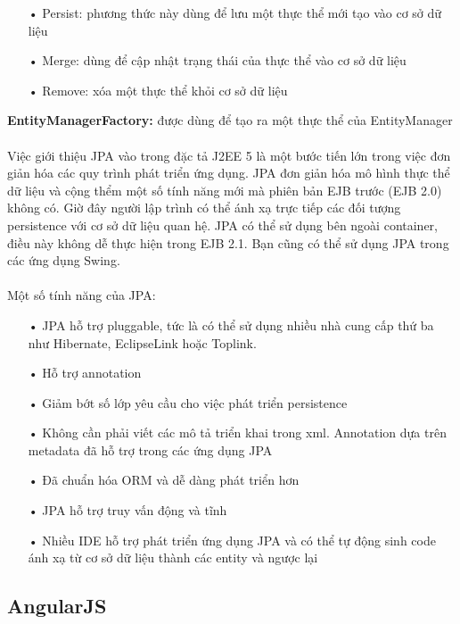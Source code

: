 \documentclass[a4paper]{article}
\begin{document}
\begin{itemize}
	\item[•]Persist: phương thức này dùng để lưu một thực thể mới tạo vào cơ sở dữ liệu
	\item[•]Merge: dùng để cập nhật trạng thái của thực thể vào cơ sở dữ liệu
	\item[•]Remove: xóa một thực thể khỏi cơ sở dữ liệu
\end{itemize}
\textbf{EntityManagerFactory: }được dùng để tạo ra một thực thể của EntityManager\\
\\
Việc giới thiệu JPA vào trong đặc tả J2EE 5 là một bước tiến lớn trong việc đơn giản hóa các quy trình phát triển ứng dụng. JPA đơn giản hóa mô hình thực thể dữ liệu và cộng thểm một số tính năng mới mà phiên bản EJB trước (EJB 2.0) không có. Giờ đây người lập trình có thể ánh xạ trực tiếp các đối tượng persistence với cơ sở dữ liệu quan hệ. JPA có thể sử dụng bên ngoài container, điều này không dễ thực hiện trong EJB 2.1. Bạn cũng có thể sử dụng JPA trong các ứng dụng Swing.\\
\\
Một số tính năng của JPA:
\begin{itemize}
	\item[•]JPA hỗ trợ pluggable, tức là có thể sử dụng nhiều nhà cung cấp thứ ba như Hibernate, EclipseLink hoặc Toplink.
	\item[•]Hỗ trợ annotation
	\item[•]Giảm bớt số lớp yêu cầu cho việc phát triển persistence
	\item[•]Không cần phải viết các mô tả triển khai trong xml. Annotation dựa trên metadata đã hỗ trợ trong các ứng dụng JPA
	\item[•]Đã chuẩn hóa ORM và dễ dàng phát triển hơn
	\item[•]JPA hỗ trợ truy vấn động và tĩnh
	\item[•]Nhiều IDE hỗ trợ phát triển ứng dụng JPA và có thể tự động sinh code ánh xạ từ cơ sở dữ liệu thành các entity và ngược lại
\end{itemize}
\subsection{AngularJS}
\end{document}
